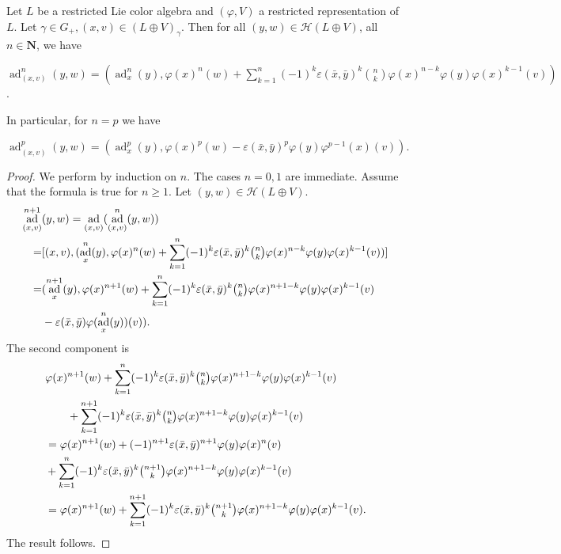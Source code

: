 \documentclass[11pt, twoside]{article}
\DeclareMathOperator{\ad}{ad}
\begin{document}
\begin{lem}\label{lem5.9}
    Let $L$ be a restricted Lie color algebra and  $(\varphi,V) $ a restricted representation of $L$. Let $\gamma\in G_+, (x,v)\in (L\oplus V)_\gamma $. Then for all $(y,w)\in \mathcal{H}(L\oplus V) $, all $n\in \mathbf{N}$, we have \begin{center}
        $\ad_{(x,v)}^n (y,w)= (\ad_x^n(y), \varphi(x)^n(w) + \sum\limits_{k=1}^n(-1)^k\varepsilon(\bar{x},\bar{y})^k\binom{n}{k}\varphi(x)^{n-k}\varphi(y)\varphi(x)^{k-1}(v)) $.
    \end{center} In particular, for $n=p$ we have \begin{center}
        $\ad_{(x,v)}^p(y,w)= (\ad_x^p(y), \varphi(x)^p(w) - \varepsilon(\bar{x},\bar{y})^p\varphi(y)\varphi^{p-1}(x)(v)). $
    \end{center}
\end{lem}

\begin{proof}
    We perform by induction on $n$. The cases $n=0,1$ are immediate. Assume that the formula is true for $n\geq 1$. Let $(y,w)\in \mathcal{H}(L\oplus V) $. \begin{align*}
        \ad_{(x,v)}^{n+1}&(y,w) =   \ad_{(x,v)}(\ad_{(x,v)}^n(y,w))\\ = & [(x,v), (\ad_x^n(y),\varphi(x)^n(w) + \sum\limits_{k=1}^n(-1)^k\varepsilon(\bar{x},\bar{y})^k\tbinom{n}{k}\varphi(x)^{n-k}\varphi(y)\varphi(x)^{k-1}(v))] \\ = & (\ad_x^{n+1}(y), \varphi(x)^{n+1}(w) + \sum\limits_{k=1}^n(-1)^k\varepsilon(\bar{x},\bar{y})^k\tbinom{n}{k}\varphi(x)^{n+1-k}\varphi(y)\varphi(x)^{k-1}(v)\\ & - \varepsilon(\bar{x},\bar{y}) \varphi(\ad_x^n(y))(v)).
    \end{align*} The second component is \begin{align*}
        & \varphi(x)^{n+1}(w) + \sum\limits_{k=1}^n(-1)^k\varepsilon(\bar{x},\bar{y})^k\tbinom{n}{k}\varphi(x)^{n+1-k}\varphi(y)\varphi(x)^{k-1}(v)\\ & \quad\quad + \sum\limits_{k=1}^{n+1}(-1)^k\varepsilon(\bar{x},\bar{y})^k\tbinom{n}{k}\varphi(x)^{n+1-k}\varphi(y)\varphi(x)^{k-1}(v) \\ & = \varphi(x)^{n+1}(w) + (-1)^{n+1}\varepsilon(\bar{x},\bar{y})^{n+1}\varphi(y)\varphi(x)^n(v) \\ &+ \sum\limits_{k=1}^n(-1)^k\varepsilon(\bar{x},\bar{y})^k\tbinom{n+1}{k}\varphi(x)^{n+1-k}\varphi(y)\varphi(x)^{k-1}(v) \\ & = \varphi(x)^{n+1}(w) + \sum\limits_{k=1}^{n+1}(-1)^k\varepsilon(\bar{x},\bar{y})^k\tbinom{n+1}{k}\varphi(x)^{n+1-k}\varphi(y)\varphi(x)^{k-1}(v).
    \end{align*} The result follows.
\end{proof}
\end{document}
